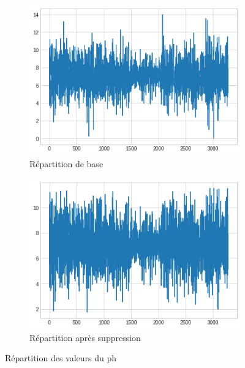 \documentclass[12pt, a4paper]{article}
\begin{document}
    \begin{figure}[H]
     \centering
     \begin{subfigure}[b]{7cm}
           \centering
           \includegraphics[width=\textwidth]{images/output_14_1.png}
           \caption{Répartition de base}
            \label{fig:ph_curve_abb}
     \end{subfigure}
     \hfill
     \begin{subfigure}[b]{7cm}
            \centering
           \includegraphics[width=\textwidth]{images/output_16_0.png}
           \caption{Répartition après suppression}
            \label{fig:ph_curve_abb_rm}
     \end{subfigure}
    \caption{Répartition des valeurs du ph}
    \label{fig:three graphs}
\end{figure}
    
\end{document}
